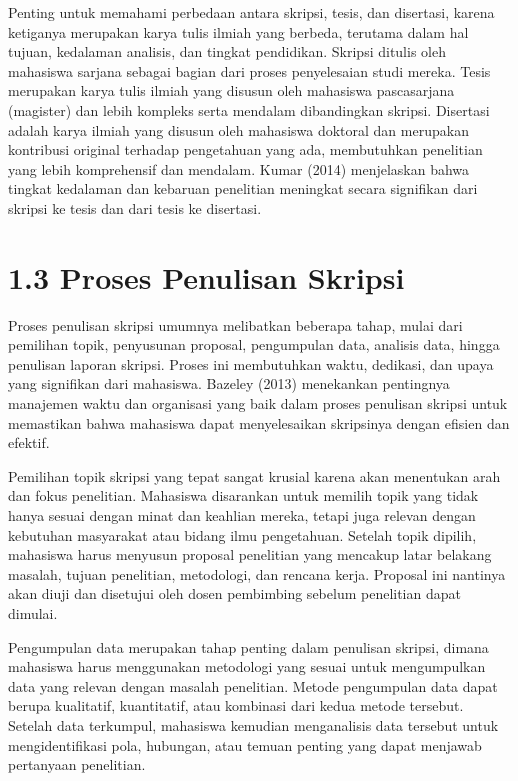 \documentclass[
  indonesian,
  letterpaper,
  DIV=11,
  numbers=noendperiod]{scrreprt}
\begin{document}
Penting untuk memahami perbedaan antara skripsi, tesis, dan disertasi,
karena ketiganya merupakan karya tulis ilmiah yang berbeda, terutama
dalam hal tujuan, kedalaman analisis, dan tingkat pendidikan. Skripsi
ditulis oleh mahasiswa sarjana sebagai bagian dari proses penyelesaian
studi mereka. Tesis merupakan karya tulis ilmiah yang disusun oleh
mahasiswa pascasarjana (magister) dan lebih kompleks serta mendalam
dibandingkan skripsi. Disertasi adalah karya ilmiah yang disusun oleh
mahasiswa doktoral dan merupakan kontribusi original terhadap
pengetahuan yang ada, membutuhkan penelitian yang lebih komprehensif dan
mendalam. Kumar (2014) menjelaskan bahwa tingkat kedalaman dan kebaruan
penelitian meningkat secara signifikan dari skripsi ke tesis dan dari
tesis ke disertasi.

\section{1.3 Proses Penulisan Skripsi}\label{proses-penulisan-skripsi}

Proses penulisan skripsi umumnya melibatkan beberapa tahap, mulai dari
pemilihan topik, penyusunan proposal, pengumpulan data, analisis data,
hingga penulisan laporan skripsi. Proses ini membutuhkan waktu,
dedikasi, dan upaya yang signifikan dari mahasiswa. Bazeley (2013)
menekankan pentingnya manajemen waktu dan organisasi yang baik dalam
proses penulisan skripsi untuk memastikan bahwa mahasiswa dapat
menyelesaikan skripsinya dengan efisien dan efektif.

Pemilihan topik skripsi yang tepat sangat krusial karena akan menentukan
arah dan fokus penelitian. Mahasiswa disarankan untuk memilih topik yang
tidak hanya sesuai dengan minat dan keahlian mereka, tetapi juga relevan
dengan kebutuhan masyarakat atau bidang ilmu pengetahuan. Setelah topik
dipilih, mahasiswa harus menyusun proposal penelitian yang mencakup
latar belakang masalah, tujuan penelitian, metodologi, dan rencana
kerja. Proposal ini nantinya akan diuji dan disetujui oleh dosen
pembimbing sebelum penelitian dapat dimulai.

Pengumpulan data merupakan tahap penting dalam penulisan skripsi, dimana
mahasiswa harus menggunakan metodologi yang sesuai untuk mengumpulkan
data yang relevan dengan masalah penelitian. Metode pengumpulan data
dapat berupa kualitatif, kuantitatif, atau kombinasi dari kedua metode
tersebut. Setelah data terkumpul, mahasiswa kemudian menganalisis data
tersebut untuk mengidentifikasi pola, hubungan, atau temuan penting yang
dapat menjawab pertanyaan penelitian.
\end{document}
